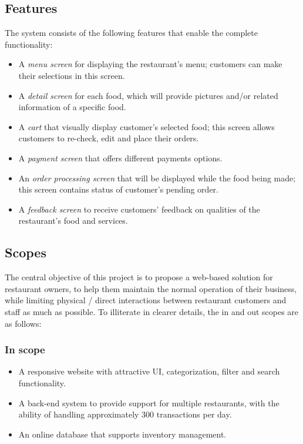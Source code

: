 \documentclass[12pt, a4paper]{article}
\theoremstyle{styleth}
\theoremstyle{styledef}
\begin{document}
\subsection{Features}
The system consists of the following features that enable the complete functionality:

\begin{itemize}
	\item A \textit{menu screen} for displaying the restaurant's menu; customers can make their selections in this screen.
	\item A \textit{detail screen} for each food, which will provide pictures and/or related information of a specific food.
	\item A \textit{cart} that visually display customer’s selected food; this screen allows customers to re-check, edit and place their orders.
	\item  A \textit{payment screen} that offers different payments options.
	\item An \textit{order processing screen} that will be displayed while the food being made; this screen contains status of customer’s pending order.
	\item A \textit{feedback screen} to receive customers’ feedback on qualities of the restaurant’s food and services.
\end{itemize}

\subsection{Scopes}

The central objective of this project is to propose a web-based solution
for restaurant owners, to help them maintain the normal operation of their business, while limiting physical / direct interactions between restaurant customers and staff as much as possible. To illiterate in clearer details, the in and out scopes are as follows: 

\subsubsection{In scope}
\begin{itemize}
	\item A responsive website with attractive UI, categorization, filter and search functionality.
	\item A back-end system to provide support for multiple restaurants, with the
	ability of handling approximately 300 transactions per day.
	\item An online database that supports inventory management.
\end{itemize}
\end{document}
